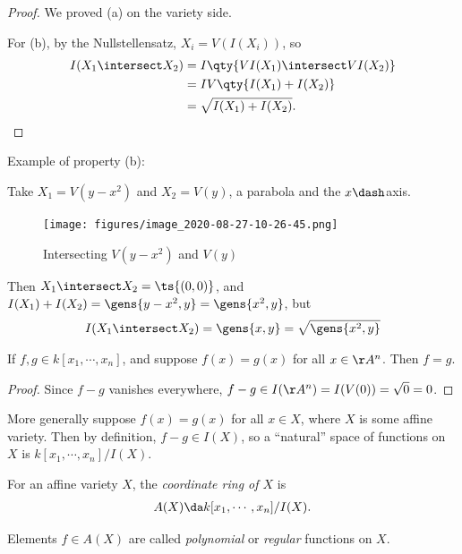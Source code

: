 \begin{proof}

We proved (a) on the variety side.

For (b), by the Nullstellensatz, \(X_i = V(I(X_i))\), so
\begin{align*}  
I(X_1\intersect X_2) 
&=
I\qty{ VI(X_1) \intersect VI(X_2)} \\
&=
IV\qty{I(X_1) + I(X_2)} \\
&= \sqrt{I(X_1) + I(X_2)}
.\end{align*}

\end{proof}

\begin{example}

Example of property (b):

Take \(X_1 = V(y-x^2)\) and \(X_2 = V(y)\), a parabola and the
\(x\dash\)axis.

\begin{figure}
\centering
\texttt{[image: figures/image\_2020-08-27-10-26-45.png]}
\caption{Intersecting \(V(y-x^2)\) and \(V(y)\)}
\end{figure}

Then \(X_1 \intersect X_2 = \ts{(0, 0)}\), and
\(I(X_1) + I(X_2) = \gens{y-x^2, y} = \gens{x^2, y}\), but
\begin{align*}
I(X_1 \intersect X_2) = \gens{x, y} = \sqrt{\gens{x^2, y}}
\end{align*}

\end{example}

\begin{proposition}[?]

If \(f, g\in k[x_1, \cdots, x_n]\), and suppose \(f(x) = g(x)\) for all
\(x\in \AA^n\). Then \(f = g\).

\end{proposition}

\begin{proof}

Since \(f-g\) vanishes everywhere,
\(f-g \in I(\AA^n) = I(V(0)) = \sqrt{0} = 0\).

\end{proof}

More generally suppose \(f(x) = g(x)\) for all \(x\in X\), where \(X\)
is some affine variety. Then by definition, \(f-g \in I(X)\), so a
``natural'' space of functions on \(X\) is \(k[x_1,\cdots, x_n]/I(X)\).

\begin{definition}

For an affine variety \(X\), the \emph{coordinate ring of \(X\)} is
\begin{align*}  
A(X) \da k[x_1, \cdots, x_n]/ I(X)
.\end{align*}

Elements \(f\in A(X)\) are called \emph{polynomial} or \emph{regular}
functions on \(X\).

\end{definition}


